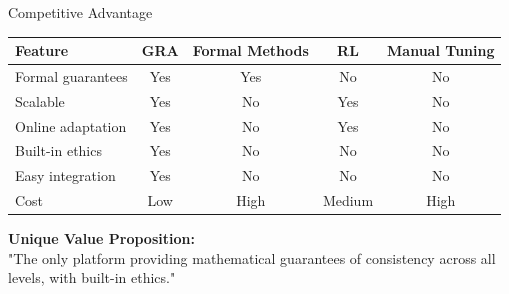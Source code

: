 \documentclass{beamer}
\begin{document}
\begin{frame}{Competitive Advantage}

\begin{table}[]
\centering
\begin{tabular}{|l|c|c|c|c|}
\hline
\textbf{Feature} & \textbf{GRA} & \textbf{Formal Methods} & \textbf{RL} & \textbf{Manual Tuning} \\
\hline
Formal guarantees & \cellcolor{green!30}Yes & \cellcolor{green!30}Yes & No & No \\
\hline
Scalable & \cellcolor{green!30}Yes & No & \cellcolor{green!30}Yes & No \\
\hline
Online adaptation & \cellcolor{green!30}Yes & No & \cellcolor{green!30}Yes & No \\
\hline
Built-in ethics & \cellcolor{green!30}Yes & No & No & No \\
\hline
Easy integration & \cellcolor{green!30}Yes & No & No & No \\
\hline
Cost & Low & High & Medium & High \\
\hline
\end{tabular}
\end{table}

\vspace{0.5cm}
\centering
\textbf{Unique Value Proposition:} \\"The only platform providing mathematical guarantees of consistency across all levels, with built-in ethics."
\end{frame}

\end{document}
